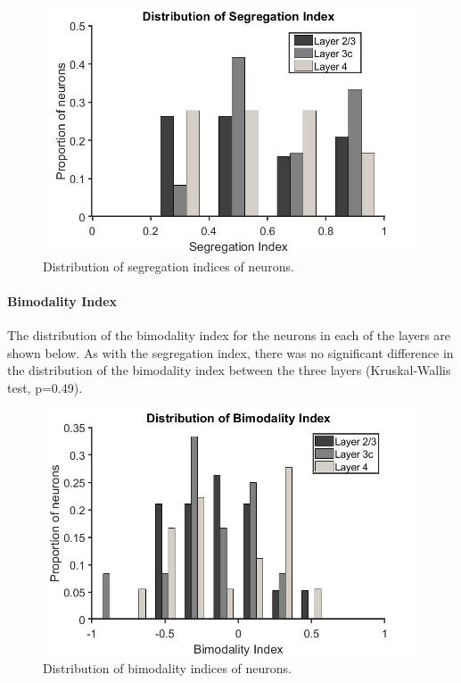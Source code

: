 	\begin{figure}[]
		
		\includegraphics[width=\linewidth]{LinearV1/segregationindex_colouradj.jpg}
		\caption{Distribution of segregation indices of neurons.}
		\label{fig:fig3}
	\end{figure}

	\paragraph{Bimodality Index}
	
	The distribution of the bimodality index for the neurons in each of the layers are shown below. As with the segregation index, there was no significant difference in the distribution of the bimodality index between the three layers (Kruskal-Wallis test, p=0.49).
	
	\begin{figure}[]
		
		\includegraphics[width=\linewidth]{LinearV1/Biindex.jpg}
		\caption{Distribution of bimodality indices of neurons.}
		\label{fig:bi}
	\end{figure}

